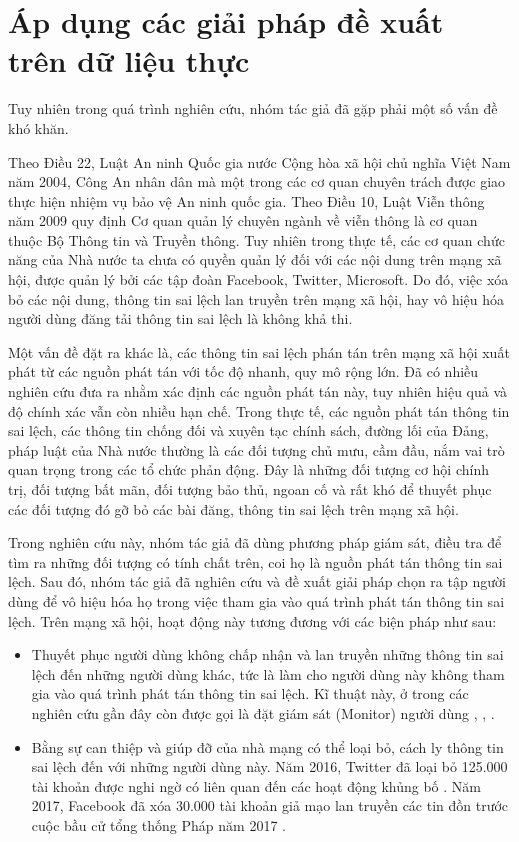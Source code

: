 \chapter{ Áp dụng các giải pháp đề xuất trên dữ liệu thực}

Tuy nhiên trong quá trình nghiên cứu, nhóm tác giả đã gặp phải một số vấn đề khó khăn.

Theo Điều 22, Luật An ninh Quốc gia nước Cộng hòa xã hội chủ nghĩa Việt Nam năm 2004, Công An nhân dân mà một trong các cơ quan chuyên trách được giao thực hiện nhiệm vụ bảo vệ An ninh quốc gia. Theo Điều 10, Luật Viễn thông năm 2009 quy định Cơ quan quản lý chuyên ngành về viễn thông là cơ quan thuộc Bộ Thông tin và Truyền thông. Tuy nhiên trong thực tế, các cơ quan chức năng của Nhà nước ta chưa có quyền quản lý đối với các nội dung trên mạng xã hội, được quản lý bởi các tập đoàn Facebook, Twitter, Microsoft. Do đó, việc xóa bỏ các nội dung, thông tin sai lệch lan truyền trên mạng xã hội, hay vô hiệu hóa người dùng đăng tải thông tin sai lệch là không khả thi. 

Một vấn đề đặt ra khác là, các thông tin sai lệch phán tán trên mạng xã hội xuất phát từ các nguồn phát tán với tốc độ nhanh, quy mô rộng lớn. Đã có nhiều nghiên cứu đưa ra nhằm xác định các nguồn phát tán này, tuy nhiên hiệu quả và độ chính xác vẫn còn nhiều hạn chế. Trong thực tế, các nguồn phát tán thông tin sai lệch, các thông tin chống đối và xuyên tạc chính sách, đường lối của Đảng, pháp luật của Nhà nước thường là các đối tượng chủ mưu, cầm đầu, nắm vai trò quan trọng trong các tổ chức phản động. Đây là những đối tượng cơ hội chính trị, đối tượng bất mãn, đối tượng bảo thủ, ngoan cố và rất khó để thuyết phục các đối tượng đó gỡ bỏ các bài đăng, thông tin sai lệch trên mạng xã hội.

Trong nghiên cứu này, nhóm tác giả đã dùng phương pháp giám sát, điều tra để tìm ra những đối tượng có tính chất trên, coi họ là nguồn phát tán thông tin sai lệch. Sau đó, nhóm tác giả đã nghiên cứu và đề xuất giải pháp chọn ra tập người dùng để vô hiệu hóa họ trong việc tham gia vào quá trình phát tán thông tin sai lệch. Trên mạng xã hội, hoạt động này tương đương với các biện pháp như sau:
\begin {itemize}
\item Thuyết phục người dùng không chấp nhận và lan truyền những thông tin sai lệch đến những người dùng khác, tức là làm cho người dùng này không tham gia vào quá trình phát tán thông tin sai lệch. Kĩ thuật này, ở trong các nghiên cứu gần đây còn được gọi là đặt giám sát (Monitor) người dùng \cite{zhang32}, \cite{zhang33}, \cite{zhang34}.

\item Bằng sự can thiệp và giúp đỡ của nhà mạng có thể loại bỏ, cách ly thông tin sai lệch đến với những người dùng này. Năm 2016, Twitter đã loại bỏ 125.000 tài khoản được nghi ngờ có liên quan đến các hoạt động khủng bố \cite{twitter}. Năm 2017, Facebook đã xóa 30.000 tài khoản giả mạo lan truyền các tin đồn trước cuộc bầu cử tổng thống Pháp năm 2017 \cite{french}.
\end {itemize}

